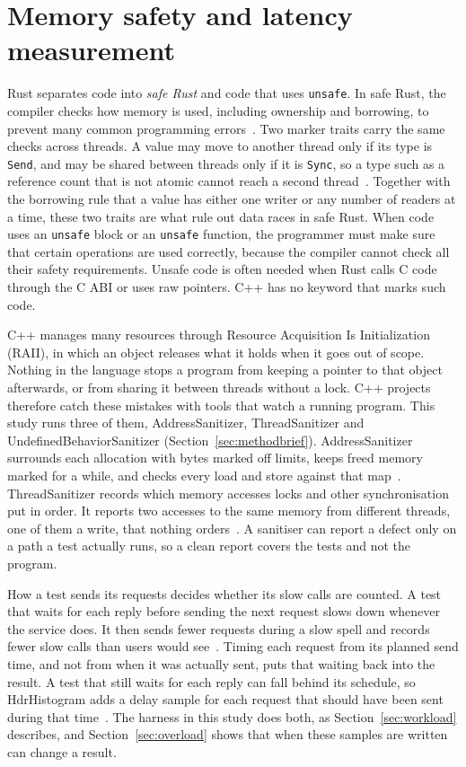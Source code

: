\documentclass[english,oneside,a4paper,censored,csm,software-track-2020]{HYthesisML}
\begin{document}
\section{Memory safety and latency measurement}\label{sec:rustsafety}
Rust separates code into \emph{safe Rust} and code that uses \texttt{unsafe}. In safe
Rust, the compiler checks how memory is used, including ownership and borrowing, to
prevent many common programming errors~\cite{klabnik2023rust,jung2018rustbelt}. Two marker
traits carry the same checks across threads. A value may move to another thread only if its
type is \texttt{Send}, and may be shared between threads only if it is \texttt{Sync}, so a
type such as a reference count that is not atomic cannot reach a second
thread~\cite{klabnik2023rust,jung2018rustbelt}. Together with the borrowing rule that a value
has either one writer or any number of readers at a time, these two traits are what rule out
data races in safe Rust.
When code uses an \texttt{unsafe} block or an \texttt{unsafe} function, the programmer must make sure
that certain operations are used correctly, because the compiler cannot check all their
safety requirements. Unsafe code is often needed when Rust calls C code through the C ABI
or uses raw pointers. C++ has no keyword that marks such code.

C++ manages many resources through Resource Acquisition Is Initialization (RAII), in
which an object releases what it holds when it goes out of scope. Nothing in the language
stops a program from keeping a pointer to that object afterwards, or from sharing it
between threads without a lock. C++ projects therefore catch these mistakes
with tools that watch a running program. This study runs three of them, AddressSanitizer,
ThreadSanitizer and UndefinedBehaviorSanitizer (Section~\ref{sec:methodbrief}).
AddressSanitizer surrounds each allocation with bytes marked off limits, keeps freed memory
marked for a while, and checks every load and store against that
map~\cite{serebryany2012asan}. ThreadSanitizer records which memory accesses locks and other
synchronisation put in order. It reports two accesses to the same memory from different
threads, one of them a write, that nothing orders~\cite{serebryany2009tsan}. A sanitiser can report a
defect only on a path a test actually runs, so a clean report covers the tests and not the
program.

How a test sends its requests decides whether its slow calls are counted. A test that
waits for each reply before sending the next request slows down whenever the service does.
It then sends fewer requests during a slow spell and records fewer slow calls than users
would see~\cite{schroeder2006openclosed}. Timing each request from its planned send time,
and not from when it was actually sent, puts that waiting back into the result. A test that
still waits for each reply can fall behind its schedule, so HdrHistogram adds a delay sample
for each request that should have been sent during that time~\cite{tene_hdrhistogram}. The
harness in this study does both, as Section~\ref{sec:workload} describes, and
Section~\ref{sec:overload} shows that when these samples are written can change a result.
\end{document}
